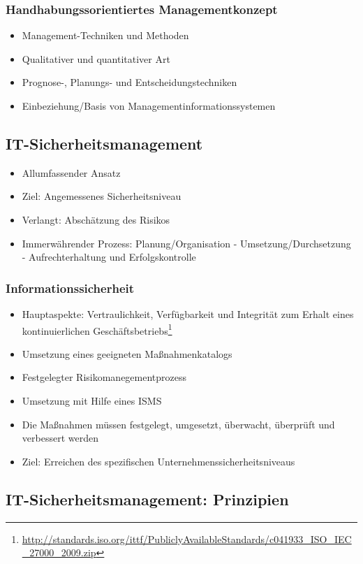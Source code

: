 \subsubsection{Handhabungssorientiertes Managementkonzept}
\begin{itemize}
	\item Management-Techniken und Methoden
	\item Qualitativer und quantitativer Art
	\item Prognose-, Planungs- und Entscheidungstechniken
	\item Einbeziehung/Basis von Managementinformationssystemen
\end{itemize}


\subsection{IT-Sicherheitsmanagement}
\begin{itemize}
	\item Allumfassender Ansatz
	\item Ziel: Angemessenes Sicherheitsniveau
	\item Verlangt: Abschätzung des Risikos
	\item Immerwährender Prozess: Planung/Organisation - Umsetzung/Durchsetzung - Aufrechterhaltung und Erfolgskontrolle
\end{itemize}

\subsubsection{Informationssicherheit}
\begin{itemize}
	\item Hauptaspekte: Vertraulichkeit, Verfügbarkeit und Integrität zum Erhalt eines kontinuierlichen Geschäftsbetriebs\footnote{\url{http://standards.iso.org/ittf/PubliclyAvailableStandards/c041933_ISO_IEC_27000_2009.zip}}
	\item Umsetzung eines geeigneten Maßnahmenkatalogs
	\item Festgelegter Risikomanegementprozess
	\item Umsetzung mit Hilfe eines ISMS
	\item Die Maßnahmen müssen festgelegt, umgesetzt, überwacht, überprüft und verbessert werden
	\item Ziel: Erreichen des spezifischen Unternehmenssicherheitsniveaus
\end{itemize}


\subsection{IT-Sicherheitsmanagement: Prinzipien}

